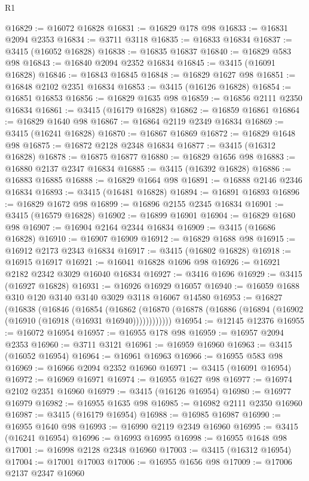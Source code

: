 \begin{lexlean}{R1}
\begin{coremodule}
@16829 := @16072 @16828
@16831 := @16829 @178 @98
@16833 := @16831 @2094 @2353
@16834 := @3711 @3118
@16835 := @16833 @16834
@16837 := @3415 (@16052 @16828)
@16838 := @16835 @16837
@16840 := @16829 @583 @98
@16843 := @16840 @2094 @2352 @16834
@16845 := @3415 (@16091 @16828)
@16846 := @16843 @16845
@16848 := @16829 @1627 @98
@16851 := @16848 @2102 @2351 @16834
@16853 := @3415 (@16126 @16828)
@16854 := @16851 @16853
@16856 := @16829 @1635 @98
@16859 := @16856 @2111 @2350 @16834
@16861 := @3415 (@16179 @16828)
@16862 := @16859 @16861
@16864 := @16829 @1640 @98
@16867 := @16864 @2119 @2349 @16834
@16869 := @3415 (@16241 @16828)
@16870 := @16867 @16869
@16872 := @16829 @1648 @98
@16875 := @16872 @2128 @2348 @16834
@16877 := @3415 (@16312 @16828)
@16878 := @16875 @16877
@16880 := @16829 @1656 @98
@16883 := @16880 @2137 @2347 @16834
@16885 := @3415 (@16392 @16828)
@16886 := @16883 @16885
@16888 := @16829 @1664 @98
@16891 := @16888 @2146 @2346 @16834
@16893 := @3415 (@16481 @16828)
@16894 := @16891 @16893
@16896 := @16829 @1672 @98
@16899 := @16896 @2155 @2345 @16834
@16901 := @3415 (@16579 @16828)
@16902 := @16899 @16901
@16904 := @16829 @1680 @98
@16907 := @16904 @2164 @2344 @16834
@16909 := @3415 (@16686 @16828)
@16910 := @16907 @16909
@16912 := @16829 @1688 @98
@16915 := @16912 @2173 @2343 @16834
@16917 := @3415 (@16802 @16828)
@16918 := @16915 @16917
@16921 := @16041 @16828 @1696 @98
@16926 := @16921 @2182 @2342 @3029 @16040 @16834
@16927 := @3416 @1696
@16929 := @3415 (@16927 @16828)
@16931 := @16926 @16929 @16057
@16940 := @16059 @1688 @310 @120 @3140 @3140 @3029 @3118 @16067 @14580
@16953 := @16827
    (@16838
      (@16846
        (@16854
          (@16862 (@16870 (@16878 (@16886 (@16894 (@16902 (@16910 (@16918 (@16931 @16940))))))))))))
@16954 := @12145 @12376
@16955 := @16072 @16954
@16957 := @16955 @178 @98
@16959 := @16957 @2094 @2353
@16960 := @3711 @3121
@16961 := @16959 @16960
@16963 := @3415 (@16052 @16954)
@16964 := @16961 @16963
@16966 := @16955 @583 @98
@16969 := @16966 @2094 @2352 @16960
@16971 := @3415 (@16091 @16954)
@16972 := @16969 @16971
@16974 := @16955 @1627 @98
@16977 := @16974 @2102 @2351 @16960
@16979 := @3415 (@16126 @16954)
@16980 := @16977 @16979
@16982 := @16955 @1635 @98
@16985 := @16982 @2111 @2350 @16960
@16987 := @3415 (@16179 @16954)
@16988 := @16985 @16987
@16990 := @16955 @1640 @98
@16993 := @16990 @2119 @2349 @16960
@16995 := @3415 (@16241 @16954)
@16996 := @16993 @16995
@16998 := @16955 @1648 @98
@17001 := @16998 @2128 @2348 @16960
@17003 := @3415 (@16312 @16954)
@17004 := @17001 @17003
@17006 := @16955 @1656 @98
@17009 := @17006 @2137 @2347 @16960

\end{coremodule}
\end{lexlean}
